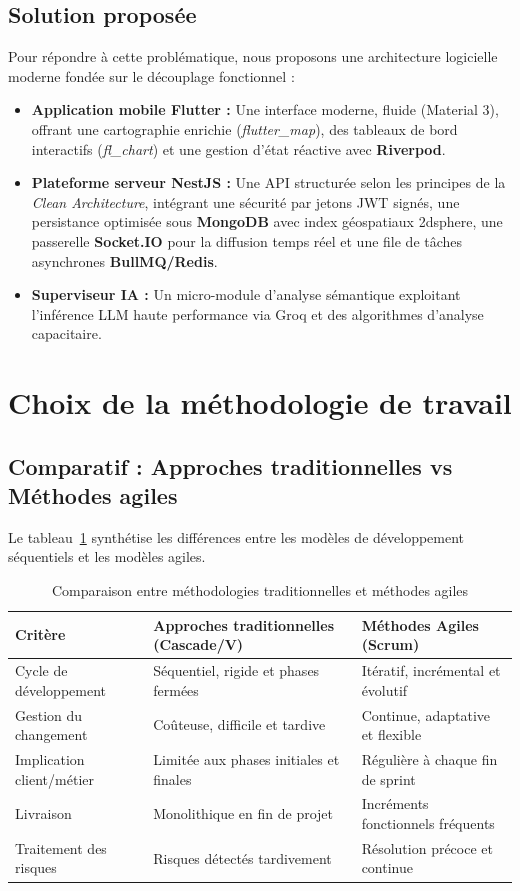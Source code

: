 \subsection{Solution propos\'ee}
Pour r\'epondre \`a cette probl\'ematique, nous proposons une architecture logicielle moderne fond\'ee sur le d\'ecouplage fonctionnel :
\begin{itemize}
    \item \textbf{Application mobile Flutter :} Une interface moderne, fluide (Material 3), offrant une cartographie enrichie (\textit{flutter\_map}), des tableaux de bord interactifs (\textit{fl\_chart}) et une gestion d'\'etat r\'eactive avec \textbf{Riverpod}.
    \item \textbf{Plateforme serveur NestJS :} Une API structur\'ee selon les principes de la \textit{Clean Architecture}, int\'egrant une s\'ecurit\'e par jetons JWT sign\'es, une persistance optimis\'ee sous \textbf{MongoDB} avec index g\'eospatiaux 2dsphere, une passerelle \textbf{Socket.IO} pour la diffusion temps r\'eel et une file de t\^aches asynchrones \textbf{BullMQ/Redis}.
    \item \textbf{Superviseur IA :} Un micro-module d'analyse s\'emantique exploitant l'inf\'erence LLM haute performance via Groq et des algorithmes d'analyse capacitaire.
\end{itemize}

\section{Choix de la m\'ethodologie de travail}

\subsection{Comparatif : Approches traditionnelles vs M\'ethodes agiles}
Le tableau~\ref{tab:metho} synth\'etise les diff\'erences entre les mod\`eles de d\'eveloppement s\'equentiels et les mod\`eles agiles.

\begin{table}[H]
\centering
\begin{tabular}{|p{3.5cm}|p{5.5cm}|p{5.5cm}|}
\hline
\textbf{Crit\`ere} & \textbf{Approches traditionnelles (Cascade/V)} & \textbf{M\'ethodes Agiles (Scrum)} \\
\hline
Cycle de d\'eveloppement & S\'equentiel, rigide et phases ferm\'ees & It\'eratif, incr\'emental et \'evolutif \\
\hline
Gestion du changement & Co\^uteuse, difficile et tardive & Continue, adaptative et flexible \\
\hline
Implication client/m\'etier & Limit\'ee aux phases initiales et finales & R\'eguli\`ere \`a chaque fin de sprint \\
\hline
Livraison & Monolithique en fin de projet & Incr\'ements fonctionnels fr\'equents \\
\hline
Traitement des risques & Risques d\'etect\'es tardivement & R\'esolution pr\'ecoce et continue \\
\hline
\end{tabular}
\caption{Comparaison entre m\'ethodologies traditionnelles et m\'ethodes agiles}
\label{tab:metho}
\end{table}

